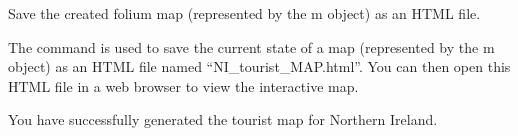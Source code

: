 \documentclass[letterpaper,10pt,english]{sphinxmanual}
\begin{document}
\sphinxAtStartPar
Save the created folium map (represented by the m object) as an HTML file.

\sphinxAtStartPar
The  command is used to save the current state of a map (represented by the m object) as an HTML file named “NI\_tourist\_MAP.html”.
You can then open this HTML file in a web browser to view the interactive map.

\begin{sphinxVerbatim}[commandchars=\\\{\}]
\end{sphinxVerbatim}

\sphinxAtStartPar
You have successfully generated the tourist map for Northern Ireland.
\end{document}

